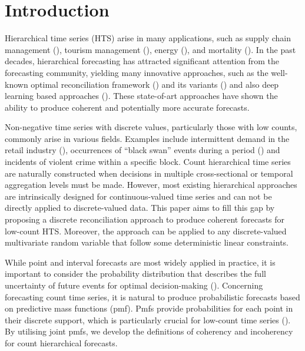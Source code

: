 \documentclass[a4paper,review,12pt,authoryear]{elsarticle}
\theoremstyle{definition}
\begin{document}
\section{Introduction}

Hierarchical time series (HTS) arise in many applications, such as supply chain management (\citealp{babaiDemandForecastingSupply2022}), tourism management (\citealp{kourentzesCrosstemporalCoherentForecasts2019}), energy (\citealp{nystrupTemporalHierarchiesAutocorrelation2020}), and mortality (\citealp{liHierarchicalMortalityForecasting2022}).
In the past decades, hierarchical forecasting has attracted significant attention from the forecasting community, yielding many innovative approaches, such as the well-known optimal reconciliation framework (\citealp{hyndmanOptimalCombinationForecasts2011, wickramasuriyaOptimalForecastReconciliation2019, panagiotelisProbabilisticForecastReconciliation2022}) and its variants () and also deep learning based approaches (\citealp{rangapuramEndtoEndLearningCoherent2021}).
These state-of-art approaches have shown the ability to produce coherent and potentially more accurate forecasts.

Non-negative time series with discrete values, particularly those with low counts, commonly arise in various fields.
Examples include intermittent demand in the retail industry (\citealp{kourentzesElucidateStructureIntermittent2021}), occurrences of ``black swan'' events during a period (\citealp{nikolopoulosWeNeedTalk2020}) and incidents of violent crime within a specific block.
Count hierarchical time series are naturally constructed when decisions in multiple cross-sectional or temporal aggregation levels must be made.
However, most existing hierarchical approaches are intrinsically designed for continuous-valued time series and can not be directly applied to discrete-valued data.
This paper aims to fill this gap by proposing a discrete reconciliation approach to produce coherent forecasts for low-count HTS.
Moreover, the approach can be applied to any discrete-valued multivariate random variable that follow some deterministic linear constraints.


While point and interval forecasts are most widely applied in practice, it is important to consider the probability distribution that describes the full uncertainty of future events for optimal decision-making (\citealp{gneitingProbabilisticForecasting2014}).
Concerning forecasting count time series, it is natural to produce probabilistic forecasts based on predictive mass functions (pmf).
Pmfs provide probabilities for each point in their discrete support,
which is particularly crucial for low-count time series (\citealp{freelandForecastingDiscreteValued2004}).
By utilising joint pmfs, we develop the definitions of coherency and incoherency for count hierarchical forecasts.
\end{document}
